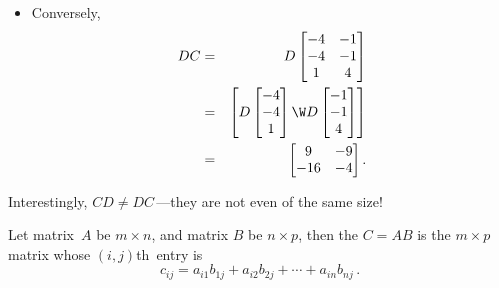 \begin{example}
\begin{solution}
\begin{itemize}
\item Conversely,
\begin{eqnarray*}
DC&=&D\begin{bmatrix} -4 & -1\\ -4 & -1\\ 1 & 4 \end{bmatrix}
\\&=&\begin{bmatrix}  D\begin{bmatrix} -4\\-4\\1 \end{bmatrix}\W
D\begin{bmatrix} -1\\-1\\4 \end{bmatrix}
\end{bmatrix}
\\&=&\begin{bmatrix} 9&-9\\-16&-4 \end{bmatrix}.
\end{eqnarray*}
\end{itemize}
Interestingly, \(CD\neq DC\)\,---they are not even of the same size!
\end{solution}
\end{example}


\begin{definition} \label{def:matprod}
  Let matrix~\(A\) be \(m\times n\), and matrix \(B\) be \(n\times p\), then the  \(C=AB\) is the \(m\times p\) matrix whose \((i,j)\)th~entry is
\begin{equation*}
c_{ij}=a_{i1}b_{1j}+a_{i2}b_{2j}+\cdots+a_{in}b_{nj}\,.
\end{equation*}
\end{definition}

